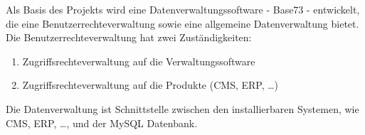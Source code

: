 Als Basis des Projekts wird eine Datenverwaltungssoftware - Base73 - entwickelt, die
eine Benutzerrechteverwaltung sowie eine allgemeine Datenverwaltung bietet.
Die Benutzerrechteverwaltung hat zwei Zuständigkeiten:
\begin{enumerate}
	\item Zugriffsrechteverwaltung auf die Verwaltungssoftware
	\item Zugriffsrechteverwaltung auf die Produkte (CMS, ERP, \ldots)
\end{enumerate}
Die Datenverwaltung ist Schnittstelle zwischen den installierbaren Systemen, wie CMS, ERP, \ldots, und der MySQL Datenbank.